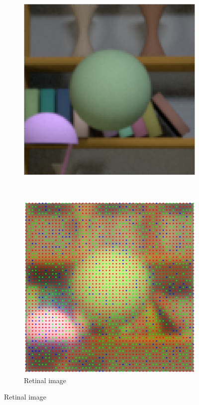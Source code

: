 \documentclass{jov}
\begin{document}
\begin{figure}
\begin{subfigure}[b]{0.19 \textwidth}
        \includegraphics[width=\textwidth]{../FiguresDraft5/Figure9/Figure9_b.png}
        \label{fig:croppedImage}
    \end{subfigure}
    ~ 
    \begin{subfigure}[b]{0.19 \textwidth}
    \hspace{0.1 \textwidth}
        \caption{Retinal image}
        \vspace{2.5mm}
        \includegraphics[width=\textwidth]{../FiguresDraft5/Figure9/Figure9_c.png}

\end{subfigure}
\end{figure}
\end{document}
